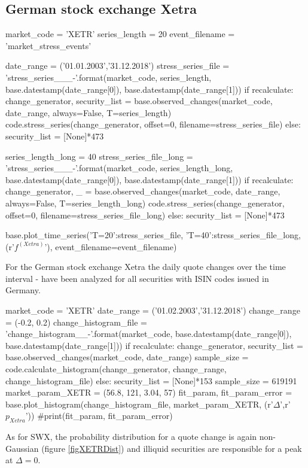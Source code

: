 \documentclass[11pt,twoside,a4paper]{article}
\numberwithin{equation}{section}
\numberwithin{figure}{section}
\numberwithin{table}{section}
\begin{document}
\FloatBarrier
\subsection{German stock exchange Xetra}
\begin{pycode}
market_code = 'XETR'
series_length = 20
event_filename = 'market_stress_events'

date_range = ('01.01.2003','31.12.2018')
stress_series_file = 'stress_series_{}_{}_{}-{}'.format(market_code, series_length, base.datestamp(date_range[0]), base.datestamp(date_range[1]))
if recalculate:
	change_generator, security_list = base.observed_changes(market_code, date_range, always=False, T=series_length)
	code.stress_series(change_generator, offset=0, filename=stress_series_file)
else:
	security_list = [None]*473

series_length_long = 40
stress_series_file_long = 'stress_series_{}_{}_{}-{}'.format(market_code, series_length_long, base.datestamp(date_range[0]), base.datestamp(date_range[1]))
if recalculate:
	change_generator, _ = base.observed_changes(market_code, date_range, always=False, T=series_length_long)
	code.stress_series(change_generator, offset=0, filename=stress_series_file_long)
else:
	security_list = [None]*473

base.plot_time_series({'T=20':stress_series_file, 'T=40':stress_series_file_long}, (r'$f^{(Xetra)}$'), event_filename=event_filename)
\end{pycode}
For the German stock exchange Xetra the daily quote changes over the time interval  -   have been analyzed for all  securities with ISIN codes issued in Germany.\\
\begin{pycode}
market_code = 'XETR'
date_range = ('01.02.2003','31.12.2018')
change_range = (-0.2, 0.2)
change_histogram_file = 'change_histogram_{}_{}-{}'.format(market_code, base.datestamp(date_range[0]), base.datestamp(date_range[1]))
if recalculate:
	change_generator, security_list = base.observed_changes(market_code, date_range)
	sample_size = code.calculate_histogram(change_generator, change_range, change_histogram_file)
else:
	security_list = [None]*153
	sample_size = 619191
market_param_XETR = (56.8, 121, 3.04, 57)
fit_param, fit_param_error = base.plot_histogram(change_histogram_file, market_param_XETR, (r'$\Delta$',r'$p_{Xetra}$'))
#print(fit_param, fit_param_error)
\end{pycode}
As for SWX, the probability distribution for a quote change is again non-Gaussian (figure \ref{figXETRDist}) and  illiquid securities are responsible for a peak at $\Delta=0$.\\
\end{document}
